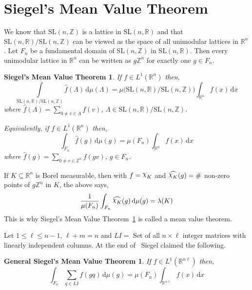 \documentclass[11pt]{article}
\newtheorem{smvt}[theorem]{Siegel's Mean Value Theorem}
\newtheorem{gsmvt}[theorem]{General Siegel's Mean Value Theorem}
\theoremstyle{definition}
\newcommand{\mychi}{\raisebox{2pt}{$\chi$}}
\begin{document}
\section{Siegel's Mean Value Theorem}
We know that $\mathrm{SL}(n, \mathbb{Z})$ is a lattice in $\mathrm{SL}(n, \mathbb{R})$ and that $\mathrm{SL}(n, \mathbb{R})/\mathrm{SL}(n, \mathbb{Z})$ can be viewed as the space of all unimodular lattices in $\mathbb{R}^{n}$.
Let $F_n$ be a fundamental domain of $\mathrm{SL}(n,  \mathbb{Z})$ in $\mathrm{SL}(n,  \mathbb{R})$.
Then every unimodular lattice in $\mathbb{R}^{n}$ can be written as $g \mathbb{Z}^n$ for exactly one $g \in F_n$.

\begin{smvt}\label{smvt}
    If $f \in L^1 (\mathbb{R}^n)$ then,
    \[
        \int\limits_{\mathrm{SL}(n,  \mathbb{R}) / \mathrm{SL}(n,  \mathbb{Z})} \widehat{f}(\Lambda  ) \, \mathrm{d} \mu (\Lambda  ) = \mu \big(\mathrm{SL}(n,\mathbb{R})/\mathrm{SL}(n,\mathbb{Z})\big)\int_{\mathbb{R}^n}f(x) \, \mathrm{d} x
    \]
    where $\widehat{f}( \Lambda ) = \displaystyle\sum_{0 \neq v \in \Lambda } f(v)$, $\Lambda \in \mathrm{SL}(n, \mathbb{R})/\mathrm{SL}(n, \mathbb{Z})$.

    Equivalently, if $f \in L^1 (\mathbb{R}^n)$ then,
    \[
        \int_{F_n} \widehat{f}(g) \, \mathrm{d} \mu (g) = \mu (F_n)\int_{\mathbb{R}^n}f(x) \, \mathrm{d} x
    \]
    where $\widehat{f}(g) = \displaystyle\sum_{0 \neq v \in \mathbb{Z}^{n}} f(gv)$, $g \in F_n$.
\end{smvt}

If $K \subseteq \mathbb{R}^n $ is Borel measurable, then with $f=\mychi _K$ and $\widehat{\mychi _{K}}(g)= \# $ non-zero points of $ g \mathbb{Z}^n$ in $K$, the above says,
\[
    \frac{1}{\mu (F_n)}\int_{F_n} \widehat{\mychi _{K}}(g) \, \mathrm{d} \mu (g) = \lambda (K)
\]
This is why Siegel's Mean Value Theorem~\ref{smvt} is called a mean value theorem.

Let $1 \le \ell  \le n-1,\, \ell +m=n$ and $LI=$ Set of all $n \times \ell$ integer matrices with linearly independent columns.
At the end of~\cite{siegel45} Siegel claimed the following.

\begin{gsmvt}\label{gsmvt}
    If $f \in L^1 ( \mathbb{R}^{n \ell})$ then,
    \[
        \displaystyle \int_{F_n} \displaystyle\sum_{q \in LI} f(gq) \, \mathrm{d} \mu (g) = \mu (F_n) \int_{\mathbb{R}^{n \ell}} f(x) \, \mathrm{d} x
    \]
\end{gsmvt}
\end{document}
